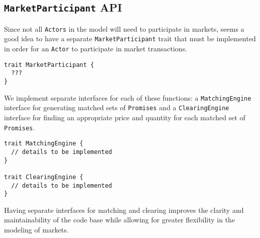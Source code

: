\documentclass[a4paper]{article}
\begin{document}
\subsection{\texttt{MarketParticipant} API}
Since not all \texttt{Actors} in the model will need to participate in markets, seems a good idea to have a separate \texttt{MarketParticipant} trait that must be implemented in order for an \texttt{Actor} to participate in market transactions.

\begin{verbatim}
trait MarketParticipant {
  ???
}
\end{verbatim}

We implement separate interfaces for each of these functions: a \texttt{MatchingEngine} interface for generating matched sets of \texttt{Promises} and a \texttt{ClearingEngine} interface for finding an appropriate price and quantity for each matched set of \texttt{Promises}. 
\begin{verbatim}
trait MatchingEngine {
  // details to be implemented
}

trait ClearingEngine {
  // details to be implemented
}
\end{verbatim}
Having separate interfaces for matching and clearing improves the clarity and maintainability of the code base while allowing for greater flexibility in the modeling of markets.
\end{document}
